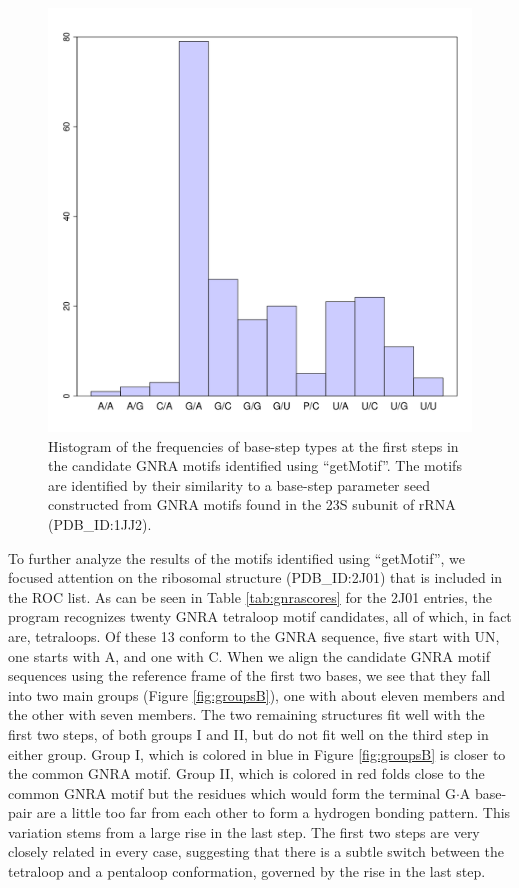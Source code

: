 \begin{figure}
\centering
\includegraphics[angle=0, scale=0.5]{Chapter5/steptypesdist.png}
\caption{Histogram of the frequencies  of base-step types at the first
  steps in  the candidate  GNRA motifs identified  using ``getMotif''.
  The  motifs  are  identified  by  their similarity  to  a  base-step
  parameter seed constructed from GNRA motifs found in the 23S subunit
  of rRNA (PDB\_ID:1JJ2).}
\label{fig:steptype}
\end{figure}

To  further  analyze  the  results  of  the  motifs  identified  using
``getMotif'',  we   focused  attention  on   the  ribosomal  structure
(PDB\_ID:2J01) that  is included in the  ROC list.  As can  be seen in
Table   \ref{tab:gnrascores}  for  the   2J01  entries,   the  program
recognizes twenty  GNRA tetraloop motif  candidates, all of  which, in
fact are, tetraloops. Of these 13 conform to the GNRA sequence, five
start with UN,  one starts with A,  and one with C.  When  we align the
candidate GNRA motif sequences using  the reference frame of the first
two  bases,  we  see that  they  fall  into  two main  groups  (Figure
\ref{fig:groupsB}), one  with about eleven members and  the other with
seven members.  The  two remaining structures fit well  with the first
two steps, of both  groups I and II, but do not  fit well on the third
step in  either group.  Group  I, which is  colored in blue  in Figure
\ref{fig:groupsB} is closer to the  common GNRA motif. Group II, which
is  colored in  red  folds close  to  the common  GNRA  motif but  the
residues  which would  form  the terminal  G$\cdot$A  base-pair are  a
little  too   far  from  each   other  to  form  a   hydrogen  bonding
pattern. This variation stems from a  large rise in the last step. The
first two  steps are  very closely related  in every  case, suggesting
that there  is a subtle switch  between the tetraloop  and a pentaloop
conformation, governed by the rise in the last step.

